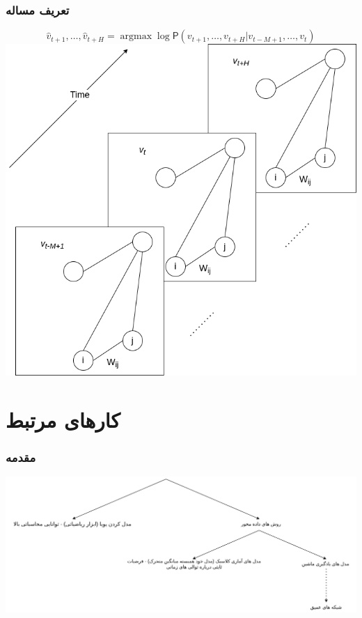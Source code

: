 \documentclass{beamer}
\begin{document}
\begin{frame}
  \frametitle{تعریف مساله}
  \begin{equation}
    \label{eq:base}
    \hat{v}_{t+1}, \ldots,  \hat{v}_{t+H} = \mathop{\mathrm{argmax}} \log \mathsf{P}({v}_{t+1}, \ldots,  v_{t+H} | v_{t-M+1} , \ldots,  v_{t})
  \end{equation}
  \centering
  \includegraphics[height=.5\textheight]{img/V.png}
\end{frame}

\section{کارهای مرتبط}

\begin{frame}
  \frametitle{مقدمه\cite{1709.04875}}
  \includegraphics[width=\textwidth]{./img/past.png}
\end{frame}
\end{document}
